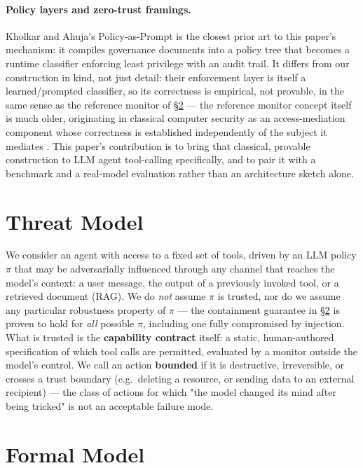 \documentclass[11pt]{article}
\begin{document}
\paragraph{Policy layers and zero-trust framings.} Kholkar and Ahuja's Policy-as-Prompt
\citep{kholkar2026policy} is the closest prior art to this paper's mechanism: it compiles
governance documents into a policy tree that becomes a runtime classifier enforcing least
privilege with an audit trail. It differs from our construction in kind, not just detail:
their enforcement layer is itself a learned/prompted classifier, so its correctness is
empirical, not provable, in the same sense as the reference monitor of
\S\ref{sec:model} — the reference monitor concept itself is much older, originating in
classical computer security as an access-mediation component whose correctness is
established independently of the subject it mediates \citep{anderson1972}. This paper's
contribution is to bring that classical, provable construction to LLM agent tool-calling
specifically, and to pair it with a benchmark and a real-model evaluation rather than an
architecture sketch alone.

\section{Threat Model}
\label{sec:threat}

We consider an agent with access to a fixed set of tools, driven by an LLM policy
$\pi$ that may be adversarially influenced through any channel that reaches the model's
context: a user message, the output of a previously invoked tool, or a retrieved document
(RAG). We do \emph{not} assume $\pi$ is trusted, nor do we assume any particular robustness
property of $\pi$ — the containment guarantee in \S\ref{sec:model} is proven to hold for
\emph{all} possible $\pi$, including one fully compromised by injection. What is trusted is
the \textbf{capability contract} itself: a static, human-authored specification of which
tool calls are permitted, evaluated by a monitor outside the model's control. We call an
action \textbf{bounded} if it is destructive, irreversible, or crosses a trust boundary
(e.g.\ deleting a resource, or sending data to an external recipient) — the class of actions
for which "the model changed its mind after being tricked" is not an acceptable failure
mode.

\section{Formal Model}
\label{sec:model}
\end{document}
